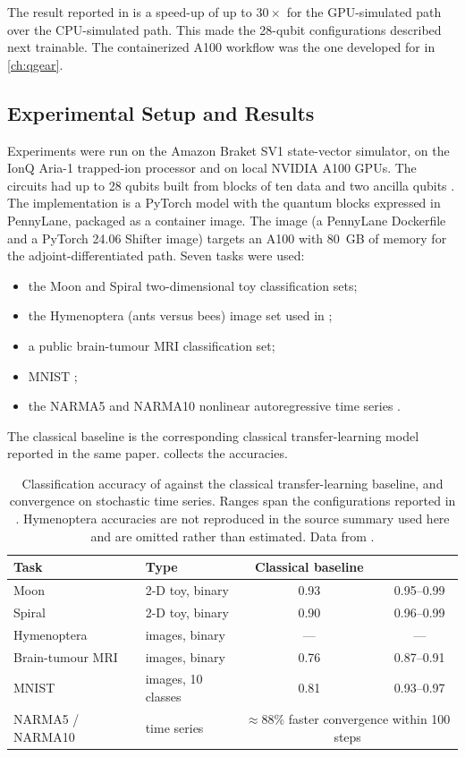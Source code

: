 The result reported in \cite{guo2025qpie} is a speed-up of up to $30\times$ for the GPU-simulated path over the CPU-simulated path. This made the 28-qubit configurations described next trainable. The containerized A100 workflow was the one developed for \qgear{} in \cref{ch:qgear}.

\subsection{Experimental Setup and Results}\label{sec:qml:qpie:results}

Experiments were run on the Amazon Braket SV1 state-vector simulator, on the IonQ Aria-1 trapped-ion processor and on local NVIDIA A100 GPUs. The circuits had up to 28 qubits built from blocks of ten data and two ancilla qubits \cite{guo2025qpie}. The implementation is a PyTorch model with the quantum blocks expressed in PennyLane, packaged as a container image. The image (a PennyLane Dockerfile and a PyTorch 24.06 Shifter image) targets an A100 with \SI{80}{GB} of memory for the adjoint-differentiated path. Seven tasks were used:
\begin{itemize}
\item the Moon and Spiral two-dimensional toy classification sets;
\item the Hymenoptera (ants versus bees) image set used in \cite{mari2020transferlearning};
\item a public brain-tumour MRI classification set;
\item MNIST \cite{lecun1998mnist};
\item the NARMA5 and NARMA10 nonlinear autoregressive time series \cite{atiya2000narma}.
\end{itemize}
The classical baseline is the corresponding classical transfer-learning model reported in the same paper.  collects the accuracies.

\begin{table}[htbp]
\caption{Classification accuracy of \qpie{} against the classical transfer-learning baseline, and convergence on stochastic time series. Ranges span the configurations reported in \cite{guo2025qpie}. Hymenoptera accuracies are not reproduced in the source summary used here and are omitted rather than estimated. Data from \cite{guo2025qpie}.}\label{tab:qml:qpie-results}
\centering
\small
\begin{tabular}{@{}llcc@{}}
\toprule
Task & Type & Classical baseline & \qpie{} \\
\midrule
Moon & 2-D toy, binary & 0.93 & 0.95--0.99 \\
Spiral & 2-D toy, binary & 0.90 & 0.96--0.99 \\
Hymenoptera & images, binary & --- & --- \\
Brain-tumour MRI & images, binary & 0.76 & 0.87--0.91 \\
MNIST & images, 10 classes & 0.81 & 0.93--0.97 \\
\midrule
NARMA5 / NARMA10 & time series & \multicolumn{2}{c}{$\approx$88\% faster convergence within 100 steps} \\
\bottomrule
\end{tabular}
\end{table}

